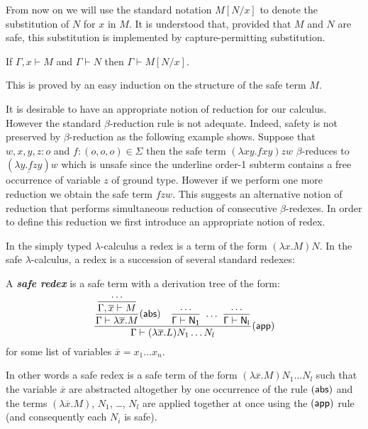\documentclass{llncs}
\newcommand\defname[1]{{\bf\em #1}\index{#1}}
\newcommand\subst[2]{\left[ #1/#2 \right]}
\newcommand\dps{\displaystyle}
\newcommand\rulef[2]{\frac{\dps #1}{\dps #2}}
\begin{document}
From now on we will use the standard notation $M\subst{N}{x}$ to denote the substitution of $N$ for $x$ in $M$.
It is understood that, provided that $M$ and $N$ are safe, this substitution
is implemented by capture-permitting substitution.


\begin{lemma}
\label{lem:subst_preserve_safety}
If $\Gamma, x \vdash M$ and $\Gamma \vdash N$ then $\Gamma \vdash M[N/x]$.
\end{lemma}
This is proved by an easy induction on the structure of the safe term $M$.


It is desirable to have an appropriate notion of reduction for our calculus. However the standard $\beta$-reduction rule is not adequate. Indeed, safety is not preserved by $\beta$-reduction as the following example shows. Suppose that $w,x,y,z : o$ and $f : (o,o,o) \in \Sigma$ then the safe term $(\lambda x y . f x y) z w$ $\beta$-reduces to $(\underline{\lambda y . f z y}) w$ which is unsafe since the underline order-1 subterm  contains a free occurrence of variable $z$ of ground type. However if we perform one more reduction we obtain the safe term
$f z w$. This suggests an alternative notion of reduction that performs simultaneous reduction of consecutive $\beta$-redexes. In order to define this reduction we first introduce an appropriate notion of redex.

In the simply typed $\lambda$-calculus a redex is a term of the form
$(\lambda x . M) N$. In the safe $\lambda$-calculus, a redex is a succession of several standard redexes:
\begin{definition}
A \defname{safe redex} is a safe term with a derivation tree of the form:
$$   \rulef{
            \rulef{\rulef{\ldots}{\Gamma, \overline{x}\vdash M}}{\Gamma \vdash \lambda \overline{x} . M} (\sf{abs})
            \quad
            \rulef{\ldots}{\Gamma \vdash N_1}  \ \ldots \  \rulef{\ldots}{\Gamma \vdash N_l}
    }
    {
       \Gamma \vdash (\lambda \overline{x} . L) N_1 \ldots N_l
    } (\sf{app})
$$
for some list of variables $\overline{x}=x_1\ldots x_n$.
\end{definition}

In other words a safe redex is a safe term of the form $(\lambda \overline{x} . M) N_1 \ldots N_l$ such that
the variable $\overline{x}$ are abstracted altogether by one occurrence of the rule $(\sf{abs})$ and the terms $(\lambda \overline{x} . M)$, $N_1$, \ldots, $N_l$ are applied together at once using the $(\sf{app})$ rule
(and consequently each $N_i$ is safe).
\end{document}
